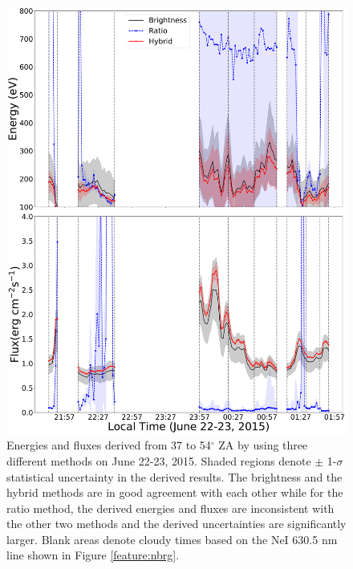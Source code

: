 \begin{figure}
	\centering\includegraphics[width=30pc]{different_method_e_fl.pdf}
	\caption{Energies and fluxes derived from 37 to 54$^\circ$ ZA by using three different methods on June 22-23, 2015. Shaded regions denote $\pm$ 1-$\sigma$ statistical uncertainty in the derived results. The brightness and the hybrid methods are in good agreement with each other while for the ratio method, the derived energies and fluxes are inconsistent with the other two methods and the derived uncertainties are significantly larger. Blank areas denote cloudy times based on the NeI 630.5 nm line shown in Figure \ref{feature:nbrg}.}
	\label{fig:e_fl_3mtd}
\end{figure}
